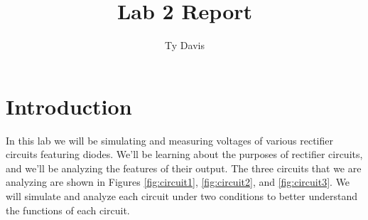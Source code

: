 \documentclass{article}
\author{Ty Davis}
\title{Lab 2 Report}
\begin{document}
\maketitle

\section{Introduction}
In this lab we will be simulating and measuring voltages
of various rectifier circuits featuring diodes. We'll be 
learning about the purposes of rectifier circuits, and 
we'll be analyzing the features of their output. The three
circuits that we are analyzing are shown in Figures \ref{fig:circuit1},
\ref{fig:circuit2}, and \ref{fig:circuit3}. We will simulate and 
analyze each circuit under two conditions to better 
understand the functions of each circuit. 
\end{document}
